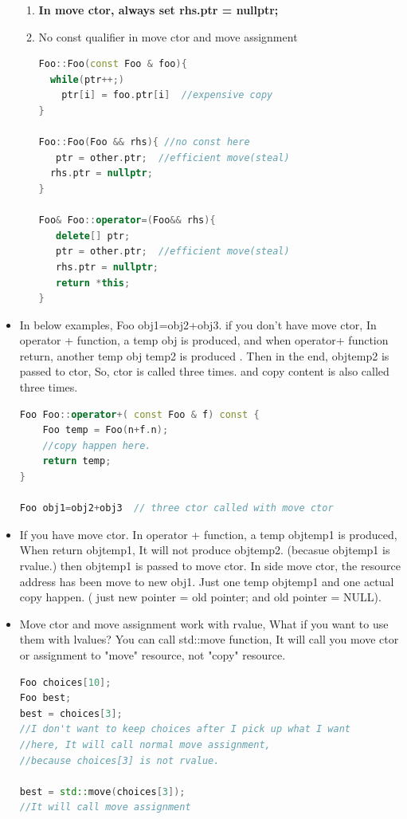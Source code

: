 \documentclass[a4paper,12pt,twoside]{book}
\begin{document}
\begin{itemize}
\begin{enumerate}
\item \textbf{In move ctor, always set rhs.ptr = nullptr;}

\item No const qualifier in move ctor and move assignment
\begin{lstlisting}[frame=single, language=c++]
Foo::Foo(const Foo & foo){
  while(ptr++;)
    ptr[i] = foo.ptr[i]  //expensive copy
}

Foo::Foo(Foo && rhs){ //no const here
   ptr = other.ptr;  //efficient move(steal)
  rhs.ptr = nullptr;
}

Foo& Foo::operator=(Foo&& rhs){
   delete[] ptr;
   ptr = other.ptr;  //efficient move(steal)
   rhs.ptr = nullptr;
   return *this;
}
\end{lstlisting}

\end{enumerate}

\item In below examples, Foo obj1=obj2+obj3. if you don't have move ctor, In operator + function, a temp obj is produced,  and when operator+ function return, another temp obj temp2 is produced .  Then in the end, objtemp2 is passed to ctor,  So, ctor is called three times. and copy content is also called three times.

\begin{lstlisting}[frame=single, language=c++]
Foo Foo::operator+( const Foo & f) const {
    Foo temp = Foo(n+f.n);
    //copy happen here.
    return temp;
}

Foo obj1=obj2+obj3  // three ctor called with move ctor
\end{lstlisting}

\item If you have move ctor. In operator + function, a temp objtemp1 is produced,  When return objtemp1, It will not produce objtemp2. (becasue objtemp1 is rvalue.) then objtemp1 is passed to move ctor. In side move ctor, the resource address has been move to new obj1.  Just one temp objtemp1 and one actual copy happen. ( just new pointer = old pointer; and old pointer = NULL).

\item Move ctor and move assignment work with rvalue, What if you want to use them with lvalues? You can call std::move function, It will call you move ctor or assignment to "move" resource, not "copy" resource.
\begin{lstlisting}[frame=single, language=c++]
Foo choices[10];
Foo best;
best = choices[3];
//I don't want to keep choices after I pick up what I want
//here, It will call normal move assignment,
//because choices[3] is not rvalue.

best = std::move(choices[3]);
//It will call move assignment
\end{lstlisting}

\end{itemize}
\end{document}
